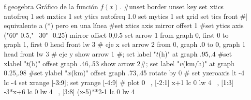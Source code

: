\begin{plot}{0.9}{f.geogebra}
  {Gráfico de la función $f(x)$.}
  #unset border
  unset key
  set xtics autofreq 1
  set mxtics 1
  set ytics autofreq 1.0
  set mytics 1
  set grid
  set tics front    #| equivalente a (*) pero en una línea
  #set xtics axis mirror offset 1
  #set ytics axis ("$60$" 0.5,"$-30$" -0.25) mirror offset 0,0.5
  set arrow 1 from graph 0, first 0 to graph 1, first 0 head front lw 3 # eje x
  set arrow 2 from 0, graph .0 to 0, graph 1 head front lw 3		# eje y 
  show arrow 1 #; set label "$t$(h)" at graph .95,.4
  #set xlabel "$t$(h)" offset  graph .46,.53
  show arrow 2#; set label "$v$(km/h)" at graph 0.25,.98 
  #set ylabel "$x$(km)" offset graph .73,.45 rotate by 0
  #
  set yzeroaxis lt -4 lc -4
  set xrange [-3:9]; set yrange [-4:9]
  #
  plot  0 \
  , [-2:1] x+1 lc 0 lw 4 \
  , [1:3] -3*x+6 lc 0 lw 4 \
  , [3:8] (x-5)**2-1 lc 0 lw 4
\end{plot}

